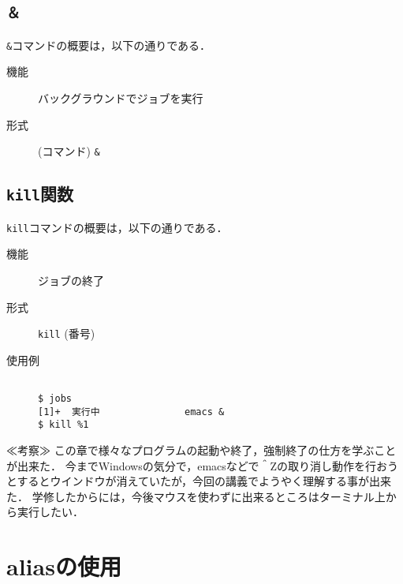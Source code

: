 \documentclass[a4j,11pt]{jarticle}
\begin{document}
\subsection{\texttt{＆}}

\verb|&|コマンドの概要は，以下の通りである．
\begin{description}
  \item[機能]
    バックグラウンドでジョブを実行
  \item[形式]
    (コマンド) \verb|&|

\end{description}

\subsection{\texttt{kill}関数}

\verb|kill|コマンドの概要は，以下の通りである．
\begin{description}
  \item[機能]
    ジョブの終了
  \item[形式]
    \verb|kill| (番号)
  \item[使用例]
    \begin{verbatim}

$ jobs
[1]+  実行中               emacs &
$ kill %1

    \end{verbatim}
\end{description}

≪考察≫
この章で様々なプログラムの起動や終了，強制終了の仕方を学ぶことが出来た．
今までWindowsの気分で，emacsなどで＾Zの取り消し動作を行おうとするとウインドウが消えていたが，今回の講義でようやく理解する事が出来た．
学修したからには，今後マウスを使わずに出来るところはターミナル上から実行したい．



\vspace{\baselineskip}
\section{aliasの使用} %
\end{document}
